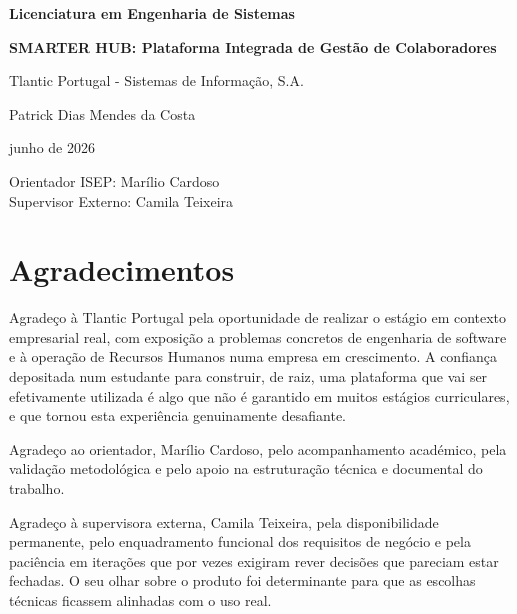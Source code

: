 \documentclass[12pt, a4paper, twoside, openright]{report}
\newcommand{\nomeautor}{Patrick Dias Mendes da Costa}
\newcommand{\frontmatter}{\pagenumbering{roman}}
\newcommand{\licenciatura}{Licenciatura em Engenharia de Sistemas}
\newcommand{\titulorelatorio}{SMARTER HUB: Plataforma Integrada de Gestão de Colaboradores}
\newcommand{\nomeorganizacao}{Tlantic Portugal - Sistemas de Informação, S.A.}
\newcommand{\dataapresentacao}{junho de 2026}
\newcommand{\orientadorisep}{Marílio Cardoso}
\newcommand{\supervisorexterno}{Camila Teixeira}
\renewcommand{\nomeautor}{Patrick Dias Mendes da Costa}
\begin{document}
\begin{titlepage}
  \thispagestyle{empty}
  \centering

  \vspace*{1cm}
  {\large\sffamily\bfseries\color{isepdark} \licenciatura}

  \vspace{3cm}
  {\LARGE\sffamily\bfseries \titulorelatorio}

  \vspace{1.5cm}
  {\large\sffamily \nomeorganizacao}

  \vfill

  {\large\sffamily \nomeautor}

  \vspace{1cm}
  {\sffamily \dataapresentacao}

  \vspace{1cm}
  {\sffamily Orientador ISEP: \orientadorisep}\\
  {\sffamily Supervisor Externo: \supervisorexterno}

  \vspace{1cm}
\end{titlepage}

\frontmatter
\pagestyle{fancy}

\chapter*{Agradecimentos}

Agradeço à Tlantic Portugal pela oportunidade de realizar o estágio em contexto empresarial
real, com exposição a problemas concretos de engenharia de software e à operação de
Recursos Humanos numa empresa em crescimento. A confiança depositada num estudante
para construir, de raiz, uma plataforma que vai ser efetivamente utilizada é algo que não é
garantido em muitos estágios curriculares, e que tornou esta experiência genuinamente
desafiante.

Agradeço ao orientador, Marílio Cardoso, pelo acompanhamento académico, pela validação
metodológica e pelo apoio na estruturação técnica e documental do trabalho.

Agradeço à supervisora externa, Camila Teixeira, pela disponibilidade permanente,
pelo enquadramento funcional dos requisitos de negócio e pela paciência em iterações
que por vezes exigiram rever decisões que pareciam estar fechadas. O seu olhar sobre o
produto foi determinante para que as escolhas técnicas ficassem alinhadas com o uso real.
\end{document}
